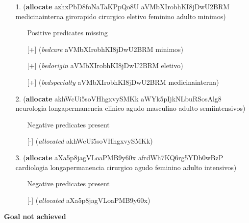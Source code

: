 \documentclass{article}
\begin{document}
\begin{itemize}
\item[1.] (\textbf{allocate} azhxPbD8foNaTaKPpQo8U aVMbXIrobhKI8jDwU2BRM medicinainterna girorapido cirurgico eletivo feminino adulto minimos)
\begin{itemize}
	\item[\textbullet] Positive predicates missing
	\item[\textbullet] [+] (\textit{bedcare} aVMbXIrobhKI8jDwU2BRM minimos)
	\item[\textbullet] [+] (\textit{bedorigin} aVMbXIrobhKI8jDwU2BRM eletivo)
	\item[\textbullet] [+] (\textit{bedspecialty} aVMbXIrobhKI8jDwU2BRM medicinainterna)
\end{itemize}
\item[2.] (\textbf{allocate} akhWcUi5soVHhgxvySMKk aWYk5pIjkNLbuRSosAlg8 neurologia longapermanencia clinico agudo masculino adulto semiintensivos)
\begin{itemize}
	\item[\textbullet] Negative predicates present
	\item[\textbullet] [-] (\textit{allocated} akhWcUi5soVHhgxvySMKk)
\end{itemize}
\item[3.] (\textbf{allocate} aXa5p8jagVLoaPMB9y60x afrdWh7KQ6rg5YDb0wBzP cardiologia longapermanencia cirurgico agudo feminino adulto intensivos)
\begin{itemize}
	\item[\textbullet] Negative predicates present
	\item[\textbullet] [-] (\textit{allocated} aXa5p8jagVLoaPMB9y60x)
\end{itemize}
\end{itemize}

\hline
\vspace{10pt}
\large \textbf{Goal not achieved}
\end{document}
